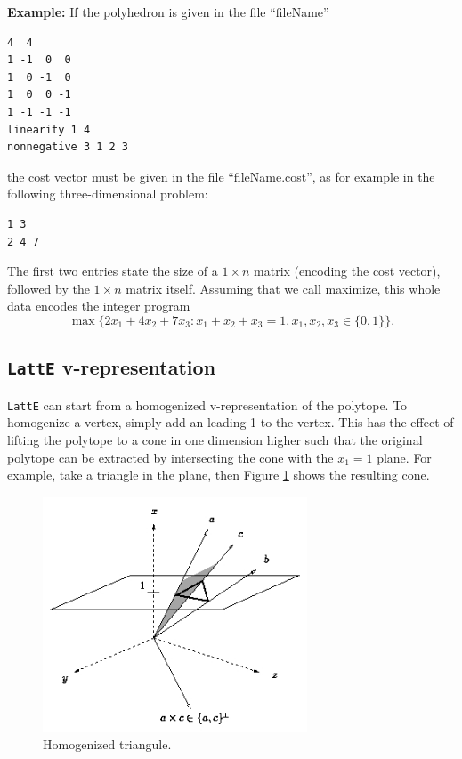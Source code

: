 \documentclass{article}
\newcommand{\latte}{{\tt LattE}\xspace}
\newcommand{\example}{{\bf Example:\space}}
\begin{document}
\example 
If the polyhedron is given in the file ``fileName''

\begin{verbatim}
4  4
1 -1  0  0
1  0 -1  0
1  0  0 -1
1 -1 -1 -1
linearity 1 4
nonnegative 3 1 2 3
\end{verbatim}
the cost vector must be given in the file ``fileName.cost'', as for
example in the following three-dimensional problem: 
\begin{verbatim}
1 3
2 4 7
\end{verbatim}
The first two entries state the size of a $1\times n$ matrix (encoding
the cost vector), followed by the $1\times n$ matrix itself. Assuming
that we call maximize, this whole data encodes the integer program
\[
\max\{2x_1+4x_2+7x_3: x_1+x_2+x_3=1, x_1,x_2,x_3\in\{0,1\}\}.
\]


\subsection{\latte v-representation}

\latte can start from a homogenized v-representation of the polytope. To homogenize a vertex, simply add an leading 1 to the vertex. This has the effect of lifting the polytope to a cone in one dimension higher such that the original polytope can be extracted by intersecting the cone with the $x_1 = 1$ plane. For example, take a triangle in the plane, then Figure \ref{fig:homogenized-triangle} shows the resulting cone.


\begin{figure}
\centering
\includegraphics[width=0.7\textwidth]{homogenizedTriangle.jpg}
\caption{Homogenized triangule.}
\label{fig:homogenized-triangle}
\end{figure}
\end{document}
